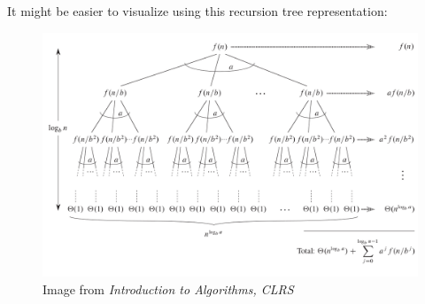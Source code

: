 \documentclass[12pt]{article}
\begin{document}
                                                                                                                                                                                                                                                                    It might be easier to visualize using this recursion tree representation:
                                                                                                                                                                                                                                                                    \begin{figure}[h]                                                                                                                                                                                                                                                                    \caption{Image from \textit{Introduction to Algorithms, CLRS}}                                                                                                                                                                                                                                                                     \includegraphics[scale=.4]{./recursion_tree_clrs.png}                                                                                                                                                                                                                                                                   
\centering
\end{figure}

                                                                                                                                                                                                                                                                     
\end{document}
